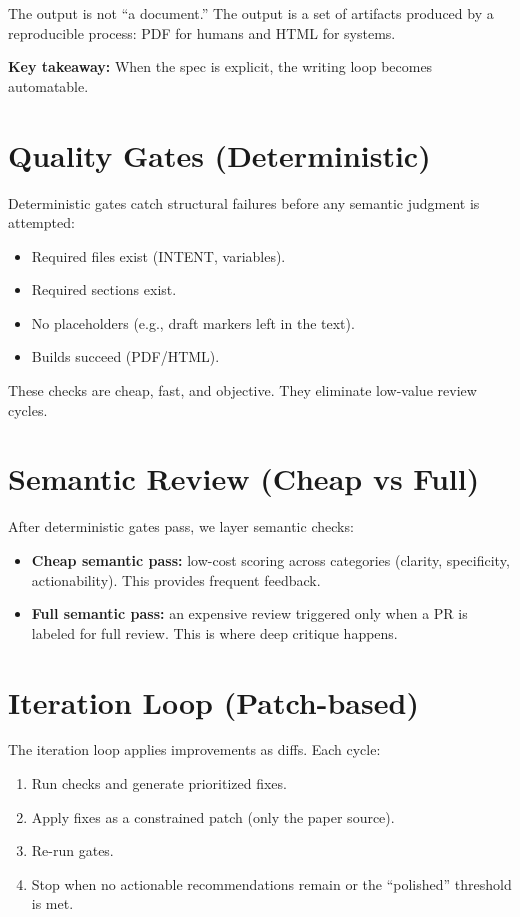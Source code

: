 \documentclass[11pt]{article}
\begin{document}
The output is not ``a document.'' The output is a set of artifacts produced by a reproducible process: PDF for humans and HTML for systems.

\begin{keytakeaway}
\textbf{Key takeaway:} When the spec is explicit, the writing loop becomes automatable.
\end{keytakeaway}

\section{Quality Gates (Deterministic)}
Deterministic gates catch structural failures before any semantic judgment is attempted:
\begin{itemize}
  \item Required files exist (INTENT, variables).
  \item Required sections exist.
  \item No placeholders (e.g., draft markers left in the text).
  \item Builds succeed (PDF/HTML).
\end{itemize}

These checks are cheap, fast, and objective. They eliminate low-value review cycles.

\section{Semantic Review (Cheap vs Full)}
After deterministic gates pass, we layer semantic checks:
\begin{itemize}
  \item \textbf{Cheap semantic pass:} low-cost scoring across categories (clarity, specificity, actionability). This provides frequent feedback.
  \item \textbf{Full semantic pass:} an expensive review triggered only when a PR is labeled for full review. This is where deep critique happens.
\end{itemize}

\section{Iteration Loop (Patch-based)}
The iteration loop applies improvements as diffs. Each cycle:
\begin{enumerate}
  \item Run checks and generate prioritized fixes.
  \item Apply fixes as a constrained patch (only the paper source).
  \item Re-run gates.
  \item Stop when no actionable recommendations remain or the ``polished'' threshold is met.
\end{enumerate}
\end{document}
